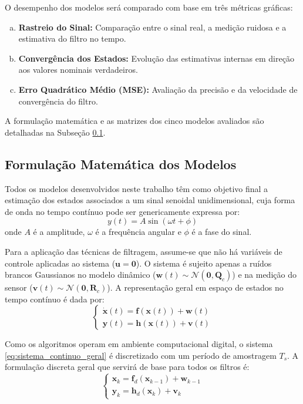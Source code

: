 \documentclass[a4paper,12pt]{article}
\begin{document}
O desempenho dos modelos será comparado com base em três métricas gráficas:
\begin{enumerate}[(a)]
    \item \textbf{Rastreio do Sinal:} Comparação entre o sinal real, a medição ruidosa e a estimativa do filtro no tempo.
    \item \textbf{Convergência dos Estados:} Evolução das estimativas internas em direção aos valores nominais verdadeiros.
    \item \textbf{Erro Quadrático Médio (MSE):} Avaliação da precisão e da velocidade de convergência do filtro.
\end{enumerate}

A formulação matemática e as matrizes dos cinco modelos avaliados são detalhadas na Subseção \ref{subsec:formulacao_modelos}.

\subsection{Formulação Matemática dos Modelos}
\label{subsec:formulacao_modelos}

Todos os modelos desenvolvidos neste trabalho têm como objetivo final a estimação dos estados associados a um sinal senoidal unidimensional, cuja forma de onda no tempo contínuo pode ser genericamente expressa por:
\begin{equation}
    y(t) = A\sin(\omega t + \phi)
    \label{eq:sinBase}
\end{equation}
onde $A$ é a amplitude, $\omega$ é a frequência angular e $\phi$ é a fase do sinal.

Para a aplicação das técnicas de filtragem, assume-se que não há variáveis de controle aplicadas ao sistema ($\mathbf{u} = \mathbf{0}$). O sistema é sujeito apenas a ruídos brancos Gaussianos no modelo dinâmico ($\mathbf{w}(t) \sim \mathcal{N}(\mathbf{0}, \mathbf{Q}_c)$) e na medição do sensor ($\mathbf{v}(t) \sim \mathcal{N}(\mathbf{0}, \mathbf{R}_c)$). A representação geral em espaço de estados no tempo contínuo é dada por:
\begin{equation}
    \begin{cases}
        \dot{\mathbf{x}}(t) = \mathbf{f}(\mathbf{x}(t)) + \mathbf{w}(t) \\
        \mathbf{y}(t) = \mathbf{h}(\mathbf{x}(t)) + \mathbf{v}(t)
    \end{cases}
    \label{eq:sistema_continuo_geral}
\end{equation}

Como os algoritmos operam em ambiente computacional digital, o sistema \eqref{eq:sistema_continuo_geral} é discretizado com um período de amostragem $T_s$. A formulação discreta geral que servirá de base para todos os filtros é:
\begin{equation}
    \begin{cases}
        \mathbf{x}_k = \mathbf{f}_d(\mathbf{x}_{k-1}) + \mathbf{w}_{k-1} \\
        \mathbf{y}_k = \mathbf{h}_d(\mathbf{x}_k) + \mathbf{v}_k
    \end{cases}
    \label{eq:sistema_discreto_geral}
\end{equation}
\end{document}
